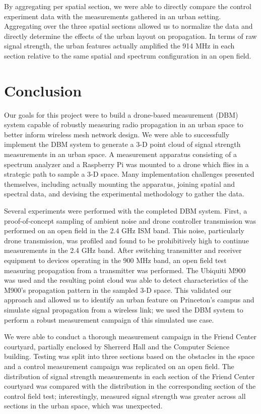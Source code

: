\documentclass[pageno]{jpaper}
\begin{document}
By aggregating per spatial section, we were able to directly compare the control experiment data with the measurements gathered in an urban setting. Aggregating over the three spatial sections allowed us to normalize the data and directly determine the effects of the urban layout on propagation. In terms of raw signal strength, the urban features actually amplified the 914 MHz in each section relative to the same spatial and spectrum configuration in an open field.
	
\section{Conclusion}
Our goals for this project were to build a drone-based measurement (DBM) system capable of robustly measuring radio propagation in an urban space to better inform wireless mesh network design. We were able to successfully implement the DBM system to generate a 3-D point cloud of signal strength measurements in an urban space. A measurement apparatus consisting of a spectrum analyzer and a Raspberry Pi was mounted to a drone which flies in a strategic path to sample a 3-D space. Many implementation challenges presented themselves, including actually mounting the apparatus, joining spatial and spectral data, and devising the experimental methodology to gather the data. 

Several experiments were performed with the completed DBM system. First, a proof-of-concept sampling of ambient noise and drone controller transmission was performed on an open field in the 2.4 GHz ISM band. This noise, particularly drone transmission, was profiled and found to be prohibitively high to continue measurements in the 2.4 GHz band. After switching transmitter and receiver equipment to devices operating in the 900 MHz band, an open field test measuring propagation from a transmitter was performed. The Ubiquiti M900 was used and the resulting point cloud was able to detect characteristics of the M900's propagation pattern in the sampled 3-D space. This validated our approach and allowed us to identify an urban feature on Princeton's campus and simulate signal propagation from a wireless link; we used the DBM system to perform a robust measurement campaign of this simulated use case.

We were able to conduct a thorough measurement campaign in the Friend Center courtyard, partially enclosed by Sherrerd Hall and the Computer Science building. Testing was split into three sections based on the obstacles in the space and a control measurement campaign was replicated on an open field. The distribution of signal strength measurements in each section of the Friend Center courtyard was compared with the distribution in the corresponding section of the control field test; interestingly,  measured signal strength was greater across all sections in the urban space, which was unexpected. 
\end{document}
